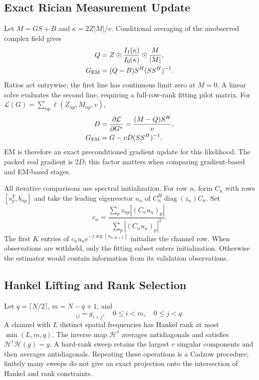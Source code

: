 \documentclass[10pt,journal,letterpaper]{IEEEtran}
\newcommand{\HH}{\mathcal{H}}
\DeclareMathOperator{\diag}{diag}
\begin{document}
\subsection{Exact Rician Measurement Update}
Let $M=GS+B$ and $\kappa=2Z|M|/v$. Conditional averaging of the unobserved complex field gives
\begin{align}
 Q&=Z\odot\frac{I_1(\kappa)}{I_0(\kappa)}\odot\frac{M}{|M|},\nonumber\\
 G_{\rm EM}&=(Q-B)S^H(SS^H)^{-1}.
 \label{eq:em}
\end{align}
Ratios act entrywise; the first line has continuous limit zero at $M=0$. A linear solve evaluates the second line, requiring a full-row-rank fitting pilot matrix. For $\mathcal L(G)=\sum_{np}\ell(Z_{np},M_{np},v)$,
\begin{align}
 D&=\frac{\partial\mathcal L}{\partial G^*}=\frac{(M-Q)S^H}{v},\nonumber\\
 G_{\rm EM}&=G-vD(SS^H)^{-1}.
\end{align}
EM is therefore an exact preconditioned gradient update for this likelihood. The packed real gradient is $2D$; this factor matters when comparing gradient-based and EM-based stages.

All iterative comparisons use spectral initialization. For row $n$, form $C_n$ with rows $[s_p^T,b_{np}]$ and take the leading eigenvector $u_n$ of $C_n^H\diag(z_n)C_n$. Set
\begin{equation}
 c_n=\frac{\sum_p z_{np}|(C_nu_n)_p|}{\sum_p|(C_nu_n)_p|^2}.
\end{equation}
The first $K$ entries of $c_nu_ne^{-j\arg(u_{n,K+1})}$ initialize the channel row. When observations are withheld, only the fitting subset enters initialization. Otherwise the estimator would contain information from its validation observations.

\subsection{Hankel Lifting and Rank Selection}
Let $q=\lceil N/2\rceil$, $m=N-q+1$, and
\begin{equation}
 [\HH(g)]_{ij}=g_{i+j},\quad 0\le i<m,\quad0\le j<q.
\end{equation}
A channel with $L$ distinct spatial frequencies has Hankel rank at most $\min(L,m,q)$. The inverse map $\HH^\dagger$ averages antidiagonals and satisfies $\HH^\dagger\HH(g)=g$. A hard-rank sweep retains the largest $r$ singular components and then averages antidiagonals. Repeating these operations is a Cadzow procedure; finitely many sweeps do not give an exact projection onto the intersection of Hankel and rank constraints.
\end{document}
